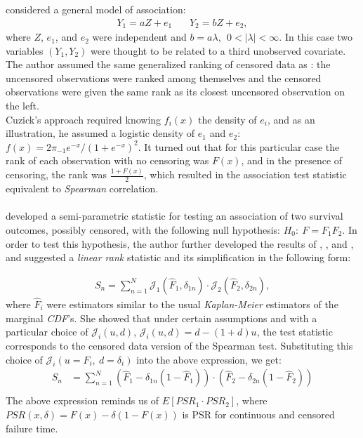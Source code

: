 \documentclass[]{article}
\begin{document}
\cite{cuzick1982rank} considered a general model of association:
	$$
	\begin{aligned}
		Y_1 = aZ + e_1 ~~~~~~~~ Y_2 = bZ + e_2,
	\end{aligned}
	$$
where $Z$, $e_1$, and $e_2$ were independent and  $b=a\lambda,~~0<|\lambda|<\infty$. In this case two variables $(Y_1, Y_2)$ were thought to be related to a third unobserved covariate.\\
The author assumed the same generalized ranking of censored data as \cite{prentice1978linear}: the uncensored observations were ranked among themselves and the censored observations were given the same rank as its closest uncensored observation on the left.\\
Cuzick's approach required knowing $f_i(x)$ the density of $e_i$, and as an illustration, he assumed a logistic density of $e_1$ and $e_2$:  $f(x) = 2\pi_{-1} e^{-x}/(1+e^{-x})^2$. It turned out that for this particular case the rank of each observation with no censoring was $F(x)$, and in the presence of censoring, the rank was $\frac{1+F(x)}{2}$, which resulted in the association test statistic equivalent to \emph{Spearman} correlation.\\
~\\

\cite{dabrowska1986rank} developed a semi-parametric statistic for testing an association of two survival outcomes, possibly censored, with the following null hypothesis: $H_0:~F=F_1 F_2$. In order to test this hypothesis, the author further developed the results of \cite{prentice1978linear} , \cite{kalbfleisch2011statistical} , and \cite{cuzick1982rank} , and suggested a \emph{linear rank} statistic and its simplification in the following form:


	$$
	\begin{aligned}
		 S_n = \sum_{n=1}^N \mathcal{J}_1( \hat{F}_1, \delta_{1n}) \cdot \mathcal{J}_2( \hat{F}_2, \delta_{2n}),
	\end{aligned}
	$$
where $\hat{F}_i$ were estimators similar to the usual \emph{Kaplan-Meier} estimators of the marginal \emph{CDF}'s. She showed that under certain assumptions and with a particular choice of $\mathcal{J}_i(u,d)$, $\mathcal{J}_i(u,d) =d-(1+d)u$, the test statistic corresponds to the censored data version of the Spearman test. Substituting this choice of $\mathcal{J}_i(u=F_i,~d=\delta_i)$ into the above expression, we get:
	$$
	\begin{aligned}
		 S_n &= \sum_{n=1}^N (\hat{F}_1 - \delta_{1n}(1-\hat{F}_1))\cdot (\hat{F}_2 - \delta_{2n}(1-\hat{F}_2))\\
	\end{aligned}
	$$
The above expression reminds us of $E[PSR_1 \cdot PSR_2]$, where $PSR(x, \delta) = F(x)-\delta(1-F(x))$ is PSR for continuous and censored failure time.\\
~\\
\end{document}
